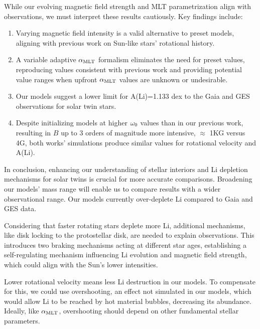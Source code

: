 \documentclass[fleqn,usenatbib]{mnras}
\begin{document}
While our evolving magnetic field strength and MLT parametrization align with observations, we must interpret these results cautiously. Key findings include:
\begin{enumerate}
    \item Varying magnetic field intensity is a valid alternative to preset models, aligning with previous work on Sun-like stars' rotational history.
    \item A variable adaptive $\alpha_{\mathrm{MLT}}$ formalism eliminates the need for preset values, reproducing values consistent with previous work and providing potential value ranges when upfront $\alpha_{\mathrm{MLT}}$ values are unknown or undesirable.
    \item Our models suggest a lower limit for A(Li)=1.133 dex to the Gaia and GES observations for solar twin stars.
    \item Despite initializing models at higher $\omega_{\mathrm{0}}$ values than in our previous work, resulting in $B$ up to 3 orders of magnitude more intensive, $\approx$ 1KG versus 4G, both works' simulations produce similar values for rotational velocity and A(Li).
\end{enumerate}

In conclusion, enhancing our understanding of stellar interiors and Li depletion mechanisms for solar twins is crucial for more accurate comparisons. Broadening our models' mass range will enable us to compare results with a wider observational range. Our models currently over-deplete Li compared to Gaia and GES data.\par

Considering that faster rotating stars deplete more Li, additional mechanisms, like disk locking to the protostellar disk, are needed to explain observations. This introduces two braking mechanisms acting at different star ages, establishing a self-regulating mechanism influencing Li evolution and magnetic field strength, which could align with the Sun's lower intensities.\par

Lower rotational velocity means less Li destruction in our models. To compensate for this, we could use overshooting, an effect not simulated in our models, which would allow Li to be reached by hot material bubbles, decreasing its abundance. Ideally, like $\alpha_{\mathrm{MLT}}$, overshooting should depend on other fundamental stellar parameters.\par


\end{document}
